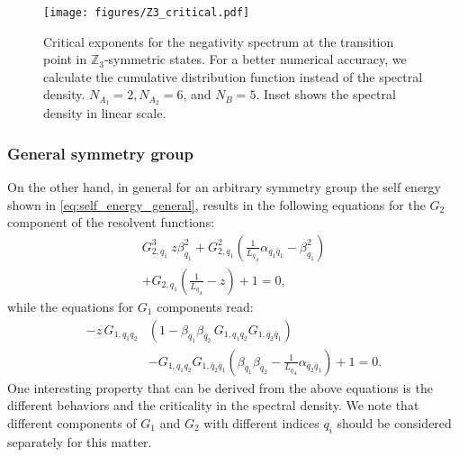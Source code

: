 \documentclass[aps,pra,reprint,superscriptaddress,twocolumn,notitlepage]{revtex4-1}
\newcommand{\Z}{\mathbb{Z}}
\numberwithin{equation}{section}
\begin{document}
\begin{figure}
    \centering
    \texttt{[image: figures/Z3\_critical.pdf]}
    \caption{Critical exponents for the negativity spectrum at the transition point in $\Z_3$-symmetric states. For a better numerical accuracy, we calculate the cumulative distribution function instead of the spectral density. $N_{A_1}=2, N_{A_2}=6$, and $N_B = 5$. Inset shows the spectral density in linear scale.}
    \label{fig:Z3-exp}
\end{figure}

\subsubsection{General symmetry group}
On the other hand, in general for an arbitrary symmetry group the self energy shown in \eqref{eq:self_energy_general}, results in the following equations for the $G_2$ component of the resolvent functions:
\begin{equation}\label{eq:general_SD_G2}
\begin{aligned}
     G_{2,q_1}^3 \ z \beta_{q_1}^2 +  G_{2,q_1}^2 \left( \frac{1}{L_{q_A}} \alpha_{q_1\bar{q}_1 } - \beta_{q_1}^2 \right) \\
     + G_{2,q_1} \left( \frac{1}{L_{q_A}} - z \right) + 1 = 0, 
\end{aligned}    
\end{equation}
while the equations for $G_1$ components read:
\begin{equation}\label{eq:general_SD_G1}
\begin{aligned}
     - z \, G_{1,q_1q_2} & \left( 1 - \beta_{q_1}\beta_{\bar{q}_2} \, G_{1,q_1 q_2} G_{1,\bar{q}_2 \bar{q}_1}  \right) \\
    & - G_{1,q_1 q_2} G_{1,\bar{q}_2 \bar{q}_1} \left( \beta_{q_1}\beta_{\bar{q}_2} - \frac{1}{L_{q_A}}\alpha_{\bar{q}_2\bar{q}_1} \right) + 1 = 0. 
\end{aligned}    
\end{equation}
One interesting property that can be derived from the above equations is the different behaviors and the criticality in the spectral density. We note that different components of $G_1$ and $G_2$ with different indices $q_i$ should be considered separately for this matter.
\end{document}
